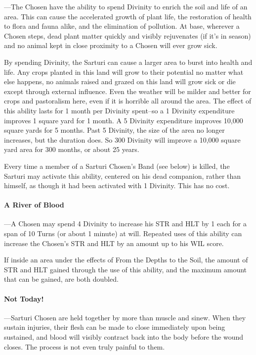 \documentclass[oneside,11pt,english]{book}
\begin{document}
---\quad The Chosen have the ability to spend Divinity to enrich the soil and life of an area. This can cause 
the accelerated growth of plant life, the restoration of health to flora and fauna alike, and the 
elimination of pollution. At base, wherever a Chosen steps, dead plant matter quickly and visibly 
rejuvenates (if it's in season) and no animal kept in close proximity to a Chosen will ever grow 
sick. 


By spending Divinity, the Sarturi can cause a larger area to burst into health and life. Any crops 
planted in this land will grow to their potential no matter what else happens, no animals raised 
and grazed on this land will grow sick or die except through external influence. Even the weather 
will be milder and better for crops and pastoralism here, even if it is horrible all around the area. 
The effect of this ability lasts for 1 month per Divinity spent--so a 1 Divinity expenditure 
improves 1 square yard for 1 month. A 5 Divinity expenditure improves 10,000 square yards for 5 
months. Past 5 Divinity, the size of the area no longer increases, but the duration does. So 300 
Divinity will improve a 10,000 square yard area for 300 months, or about 25 years. 


Every time a member of a Sarturi Chosen's Band (see below) is killed, the Sarturi may activate this ability, centered on his dead companion, rather than himself, as though it had been activated 
with 1 Divinity. This has no cost.
\paragraph{A River of Blood}
---\quad A Chosen may spend 4 Divinity to increase his STR and HLT by 1 each for a span of 10 Turns 
(or about 1 minute) at will. Repeated uses of this ability can increase the Chosen's STR and HLT 
by an amount up to his WIL score. 

If inside an area under the effects of From the Depths to the Soil, the amount of STR and HLT 
gained through the use of this ability, and the maximum amount that can be gained, are both doubled.
\paragraph{Not Today!}
---\quad Sarturi Chosen are held together by more than muscle and sinew. When they sustain injuries, 
their flesh can be made to close immediately upon being sustained, and blood will visibly contract 
back into the body before the wound closes. The process is not even truly painful to them. 
\end{document}
